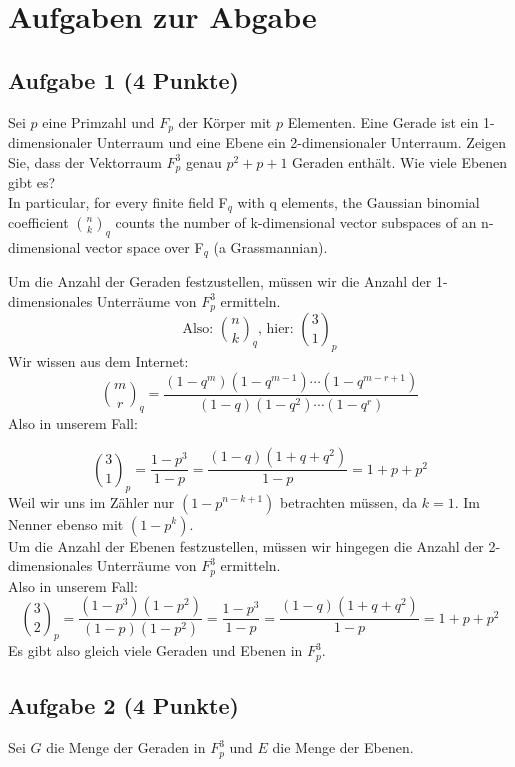 \documentclass{article} %
\begin{document}
\section*{Aufgaben zur Abgabe}

\subsection*{Aufgabe 1 (4 Punkte)}
Sei \( p \) eine Primzahl und \( F_p \) der Körper mit \( p \) Elementen. Eine Gerade ist ein 1-dimensionaler Unterraum und eine Ebene ein 2-dimensionaler Unterraum. Zeigen Sie, dass der Vektorraum \( F_p^3 \) genau \( p^2 + p + 1 \) Geraden enthält. Wie viele Ebenen gibt es? \\
\color{Blue}
In particular, for every finite field F$_q$ with q elements, the Gaussian binomial coefficient
\( \binom{n}{k}_q \)
counts the number of k-dimensional vector subspaces of an n-dimensional vector space over F$_q$ (a Grassmannian). \cite{enwikiqbinom} 
\color{black}
\begin{mybox}
    Um die Anzahl der Geraden festzustellen, müssen wir die Anzahl der 1-dimensionales Unterräume von \( F_p^3 \) ermitteln. \\
    \[ \text{Also: }\binom{n}{k}_q\text{, hier: } \binom{3}{1}_p\]
    Wir wissen aus dem Internet: \cite{enwikiqbinom}
    \[
\binom{m}{r}_q = \frac{(1 - q^m)(1 - q^{m-1}) \cdots (1 - q^{m-r+1})}{(1 - q)(1 - q^2) \cdots (1 - q^r)}
\]
Also in unserem Fall: 

\[
\binom{3}{1}_p  = \frac{1 - p^3}{1 - p} = 
\frac{(1-q)(1+q+q^2)}{1 - p} = 1 + p + p^2
\]
Weil wir uns im Zähler nur $(1 - p^{n-k+1})$ betrachten müssen, da $k = 1$. Im Nenner ebenso mit $(1 - p^k)$. \\ \newline
Um die Anzahl der Ebenen festzustellen, müssen wir hingegen die Anzahl der 2-dimensionales Unterräume von \( F_p^3 \) ermitteln. \\
Also in unserem Fall: 
\[
{3 \choose 2}_{p} = \frac{(1 - p^3)(1 - p^2)}{(1 - p)(1 - p^2)} = \frac{1 - p^3}{1 - p} = 
\frac{(1-q)(1+q+q^2)}{1 - p} = 1 + p + p^2
\]
Es gibt also gleich viele Geraden und Ebenen in \( F_p^3 \). 
\end{mybox}
\subsection*{Aufgabe 2 (4 Punkte)}
Sei \( G \) die Menge der Geraden in \( F_p^3 \) und \( E \) die Menge der Ebenen.
\end{document}
